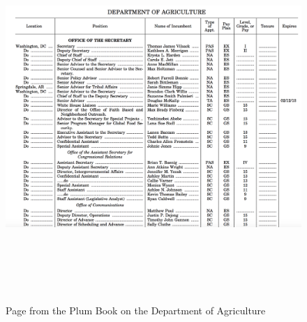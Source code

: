 \documentclass[12pt]{article}
\begin{document}
\newpage
\begin{figure}[htb]
\begin{center}
\includegraphics[height=5.5in,width=7in]{PlumBookPage.png}
\caption{Page from the Plum Book on the Department of Agriculture}
\end{center}
\end{figure}
\end{document}
